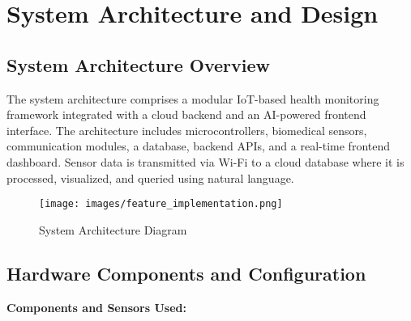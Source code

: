 \section{System Architecture and Design}

\subsection{System Architecture Overview}

The system architecture comprises a modular IoT-based health monitoring framework integrated with a cloud backend and an AI-powered frontend interface. The architecture includes microcontrollers, biomedical sensors, communication modules, a database, backend APIs, and a real-time frontend dashboard. Sensor data is transmitted via Wi-Fi to a cloud database where it is processed, visualized, and queried using natural language.

\begin{figure}[h!]
\centering
\texttt{[image: images/feature\_implementation.png]}
\caption{System Architecture Diagram}
\end{figure}

\subsection{Hardware Components and Configuration}

\textbf{Components and Sensors Used:}

